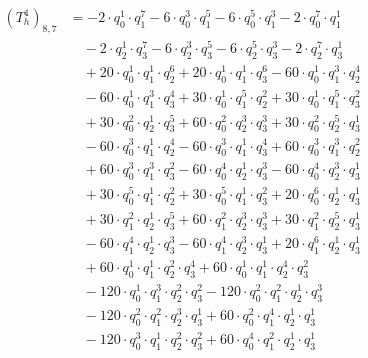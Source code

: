 \begin{align*}(T_{h}^4)_{8,7}&=-2\cdot q_0^{1}\cdot q_1^{7}-6\cdot q_0^{3}\cdot q_1^{5}-6\cdot q_0^{5}\cdot q_1^{3}-2\cdot q_0^{7}\cdot q_1^{1}\\
&\quad -2\cdot q_2^{1}\cdot q_3^{7}-6\cdot q_2^{3}\cdot q_3^{5}-6\cdot q_2^{5}\cdot q_3^{3}-2\cdot q_2^{7}\cdot q_3^{1}\\
&\quad +20\cdot q_0^{1}\cdot q_1^{1}\cdot q_2^{6}+20\cdot q_0^{1}\cdot q_1^{1}\cdot q_3^{6}-60\cdot q_0^{1}\cdot q_1^{3}\cdot q_2^{4}\\
&\quad -60\cdot q_0^{1}\cdot q_1^{3}\cdot q_3^{4}+30\cdot q_0^{1}\cdot q_1^{5}\cdot q_2^{2}+30\cdot q_0^{1}\cdot q_1^{5}\cdot q_3^{2}\\
&\quad +30\cdot q_0^{2}\cdot q_2^{1}\cdot q_3^{5}+60\cdot q_0^{2}\cdot q_2^{3}\cdot q_3^{3}+30\cdot q_0^{2}\cdot q_2^{5}\cdot q_3^{1}\\
&\quad -60\cdot q_0^{3}\cdot q_1^{1}\cdot q_2^{4}-60\cdot q_0^{3}\cdot q_1^{1}\cdot q_3^{4}+60\cdot q_0^{3}\cdot q_1^{3}\cdot q_2^{2}\\
&\quad +60\cdot q_0^{3}\cdot q_1^{3}\cdot q_3^{2}-60\cdot q_0^{4}\cdot q_2^{1}\cdot q_3^{3}-60\cdot q_0^{4}\cdot q_2^{3}\cdot q_3^{1}\\
&\quad +30\cdot q_0^{5}\cdot q_1^{1}\cdot q_2^{2}+30\cdot q_0^{5}\cdot q_1^{1}\cdot q_3^{2}+20\cdot q_0^{6}\cdot q_2^{1}\cdot q_3^{1}\\
&\quad +30\cdot q_1^{2}\cdot q_2^{1}\cdot q_3^{5}+60\cdot q_1^{2}\cdot q_2^{3}\cdot q_3^{3}+30\cdot q_1^{2}\cdot q_2^{5}\cdot q_3^{1}\\
&\quad -60\cdot q_1^{4}\cdot q_2^{1}\cdot q_3^{3}-60\cdot q_1^{4}\cdot q_2^{3}\cdot q_3^{1}+20\cdot q_1^{6}\cdot q_2^{1}\cdot q_3^{1}\\
&\quad +60\cdot q_0^{1}\cdot q_1^{1}\cdot q_2^{2}\cdot q_3^{4}+60\cdot q_0^{1}\cdot q_1^{1}\cdot q_2^{4}\cdot q_3^{2}\\
&\quad -120\cdot q_0^{1}\cdot q_1^{3}\cdot q_2^{2}\cdot q_3^{2}-120\cdot q_0^{2}\cdot q_1^{2}\cdot q_2^{1}\cdot q_3^{3}\\
&\quad -120\cdot q_0^{2}\cdot q_1^{2}\cdot q_2^{3}\cdot q_3^{1}+60\cdot q_0^{2}\cdot q_1^{4}\cdot q_2^{1}\cdot q_3^{1}\\
&\quad -120\cdot q_0^{3}\cdot q_1^{1}\cdot q_2^{2}\cdot q_3^{2}+60\cdot q_0^{4}\cdot q_1^{2}\cdot q_2^{1}\cdot q_3^{1}\end{align*}
